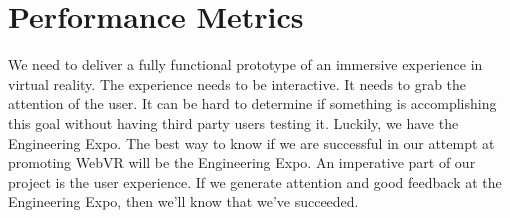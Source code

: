 \documentclass[draftclsnofoot,onecolumn,letterpaper,10pt]{article}
\begin{document}
\section{Performance Metrics}
We need to deliver a fully functional prototype of an immersive experience in virtual reality. The experience needs to be interactive. It needs to grab the attention of the user. It can be hard to determine if something is accomplishing this goal without having third party users testing it. Luckily, we have the Engineering Expo. The best way to know if we are successful in our attempt at promoting WebVR will be the Engineering Expo. An imperative part of our project is the user experience. If we generate attention and good feedback at the Engineering Expo, then we'll know that we've succeeded.

\nocite{*}

\end{document}
